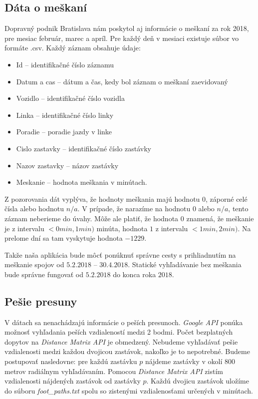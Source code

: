 \subsection{Dáta o meškaní}
Dopravný podnik Bratislava nám poskytol aj informácie o meškaní za rok 2018, pre mesiac február, marec a apríl. Pre každý deň v mesiaci existuje súbor vo formáte .csv. Každý záznam obsahuje údaje:
\begin{itemize}
\item{Id – identifikačné číslo záznamu}
\item{Datum a cas – dátum a čas, kedy bol záznam o meškaní zaevidovaný}
\item{Vozidlo – identifikačné číslo vozidla}
\item{Linka – identifikačné číslo linky}
\item{Poradie – poradie jazdy v linke}
\item{Cislo zastavky – identifikačné číslo zastávky}
\item{Nazov zastavky – názov zastávky}
\item{Meskanie – hodnota meškania v minútach.}
\end{itemize}

Z pozorovania dát vyplýva, že hodnoty meškania majú hodnotu $0$, záporné celé čísla alebo hodnotu $n/a$. V prípade, že narazíme na hodnotu $0$ alebo $n/a$, tento záznam neberieme do úvahy. Môže ale platiť, že hodnota $0$ znamená, že meškanie je z intervalu $<0 min, 1 min)$ minúta, hodnota $1$ z intervalu $<1 min, 2 min)$. Na prelome dní sa tam vyskytuje hodnota $-1229$. 

Takže naša aplikácia bude môcť ponúknuť správne cesty s prihliadnutím na meškanie spojov od $5.2.2018$ – $30.4.2018$. Statické vyhľadávanie bez meškania bude správne fungovať od $5.2.2018$ do konca roka $2018$.

\subsection{Pešie presuny}
V dátach sa nenachádzajú informácie o peších presunoch. \textit{Google API} ponúka možnosť vyhľadania peších vzdialeností medzi 2 bodmi. Počet bezplatných dopytov na \textit{Distance Matrix API} je obmedzený. Nebudeme vyhľadávať pešie vzdialenosti medzi každou dvojicou zastávok, nakoľko je to nepotrebné. 
Budeme postupovať nasledovne: pre každú zastávku $p$ nájdeme zastávky v okolí 800 metrov radiálnym vyhľadávaním. Pomocou \textit{Distance Matrix API} zistím vzdialenosti nájdených zastávok od zastávky $p$. Každú dvojicu zastávok uložíme do súboru \textit{foot\_paths.txt} spolu so zistenými vzdialenosťami určených v minútach.


